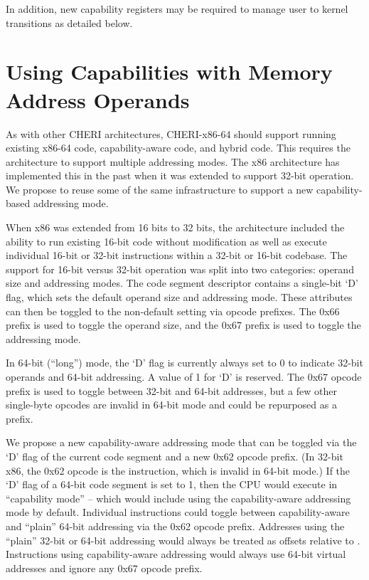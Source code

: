 In addition, new capability registers may be required to manage user
to kernel transitions as detailed below.

\section{Using Capabilities with Memory Address Operands}

As with other CHERI architectures, CHERI-x86-64 should support running existing
x86-64 code, capability-aware code, and hybrid code.  This
requires the architecture to support multiple addressing modes.
The x86 architecture has implemented this in the past when it was
extended to support 32-bit operation.  We propose to reuse some of the
same infrastructure to support a new capability-based addressing
mode.

When x86 was extended from 16 bits to 32 bits, the architecture
included the ability to run existing 16-bit code without modification
as well as execute individual 16-bit or 32-bit instructions within a
32-bit or 16-bit codebase.  The support for 16-bit versus 32-bit
operation was
split into two categories: operand size and addressing modes.  The
code segment descriptor contains a single-bit `D' flag, which sets the
default operand size and addressing mode.  These attributes can then
be toggled to the non-default setting via opcode prefixes.  The 0x66
prefix is used to toggle the operand size, and the 0x67 prefix is used
to toggle the addressing mode.

In 64-bit (``long'') mode, the `D' flag is currently always set to
0 to indicate 32-bit operands and 64-bit addressing.  A value of
1 for `D' is reserved.  The 0x67 opcode prefix is used to toggle
between 32-bit and 64-bit addresses, but a few other single-byte opcodes
are invalid in 64-bit mode and could be repurposed as a prefix.

We propose a new capability-aware addressing mode that can be
toggled via the `D' flag of the current code segment and a new 0x62
opcode prefix.  (In 32-bit x86, the 0x62 opcode is the
 instruction, which is invalid in 64-bit mode.)
If the `D' flag of a 64-bit code segment is set to 1,
then the CPU would execute in ``capability mode'' -- which would include
using the capability-aware addressing mode by default.  Individual
instructions could toggle between capability-aware and ``plain''
64-bit addressing via the 0x62 opcode prefix.  Addresses using the
``plain'' 32-bit or 64-bit addressing would always be treated as offsets
relative to \DDC{}.  Instructions using capability-aware addressing
would always use 64-bit virtual addresses and ignore any 0x67 opcode
prefix.

